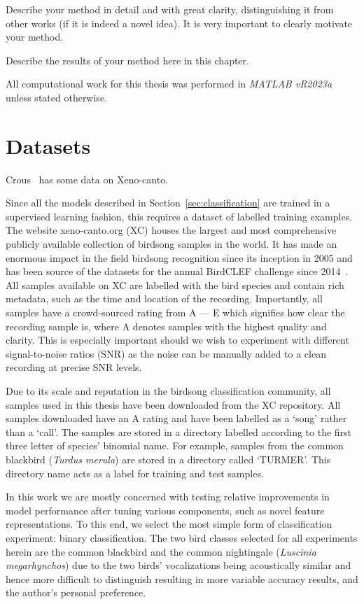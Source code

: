 Describe your method in detail and with great clarity, distinguishing it from
other works (if it is indeed a novel idea). It is very important to clearly
motivate your method.

Describe the results of your method here in this chapter.

All computational work for this thesis was performed in \textit{MATLAB vR2023a}
unless stated otherwise.

\section{Datasets}

Crous~\cite{crous2019polyphonic} has some data on Xeno-canto.

Since all the models described in Section~\ref{sec:classification} are trained
in a supervised learning fashion, this requires a dataset of labelled training
examples. The website xeno-canto.org (XC) houses the largest and most
comprehensive publicly available collection of birdsong samples in the world. It
has made an enormous impact in the field birdsong recognition since its
inception in 2005 and has been source of the datasets for the annual BirdCLEF
challenge since 2014~\cite{vellinga2015xeno}. All samples available on XC are
labelled with the bird species and contain rich metadata, such as the time and
location of the recording. Importantly, all samples have a crowd-sourced rating
from A --- E which signifies how clear the recording sample is, where A denotes
samples with the highest quality and clarity. This is especially important
should we wish to experiment with different signal-to-noise ratios (SNR) as the
noise can be manually added to a clean recording at precise SNR levels.

Due to its scale and reputation in the birdsong classification community, all
samples used in this thesis have been downloaded from the XC repository. All
samples downloaded have an A rating and have been labelled as a `song' rather
than a `call'. The samples are stored in a directory labelled according to the
first three letter of species' binomial name. For example, samples from the
common blackbird (\textit{Turdus merula}) are stored in a directory called
`TURMER'. This directory name acts as a label for training and test samples.

In this work we are mostly concerned with testing relative improvements in model
performance after tuning various components, such as novel feature
representations. To this end, we select the most simple form of classification
experiment: binary classification. The two bird classes selected for all
experiments herein are the common blackbird and the common nightingale
(\textit{Luscinia megarhynchos}) due to the two birds' vocalizations being
acoustically similar and hence more difficult to distinguish resulting in more
variable accuracy results, and the author's personal preference.

